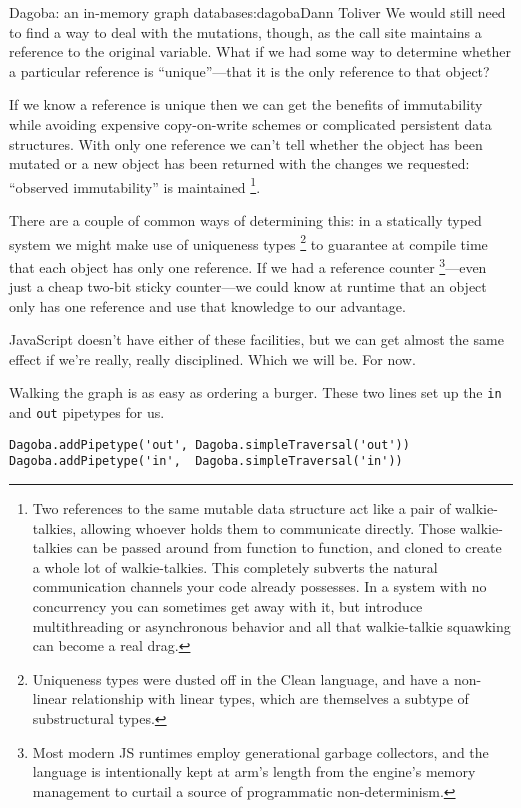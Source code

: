 \begin{aosachapter}{Dagoba: an in-memory graph database}{s:dagoba}{Dann Toliver}
We would still need to find a way to deal with the mutations, though, as
the call site maintains a reference to the original variable. What if we
had some way to determine whether a particular reference is
``unique''---that it is the only reference to that object?

If we know a reference is unique then we can get the benefits of
immutability while avoiding expensive copy-on-write schemes or
complicated persistent data structures. With only one reference we can't
tell whether the object has been mutated or a new object has been
returned with the changes we requested: ``observed immutability'' is
maintained \footnote{Two references to the same mutable data structure
  act like a pair of walkie-talkies, allowing whoever holds them to
  communicate directly. Those walkie-talkies can be passed around from
  function to function, and cloned to create a whole lot of
  walkie-talkies. This completely subverts the natural communication
  channels your code already possesses. In a system with no concurrency
  you can sometimes get away with it, but introduce multithreading or
  asynchronous behavior and all that walkie-talkie squawking can become
  a real drag.}.

There are a couple of common ways of determining this: in a statically
typed system we might make use of uniqueness types \footnote{Uniqueness
  types were dusted off in the Clean language, and have a non-linear
  relationship with linear types, which are themselves a subtype of
  substructural types.} to guarantee at compile time that each object
has only one reference. If we had a reference counter \footnote{Most
  modern JS runtimes employ generational garbage collectors, and the
  language is intentionally kept at arm's length from the engine's
  memory management to curtail a source of programmatic non-determinism.}---even
just a cheap two-bit sticky counter---we could know at runtime that an
object only has one reference and use that knowledge to our advantage.

JavaScript doesn't have either of these facilities, but we can get
almost the same effect if we're really, really disciplined. Which we
will be. For now.

\label{in-n-out}

Walking the graph is as easy as ordering a burger. These two lines set
up the \texttt{in} and \texttt{out} pipetypes for us.

\begin{verbatim}
Dagoba.addPipetype('out', Dagoba.simpleTraversal('out'))
Dagoba.addPipetype('in',  Dagoba.simpleTraversal('in'))
\end{verbatim}


\end{aosachapter}
